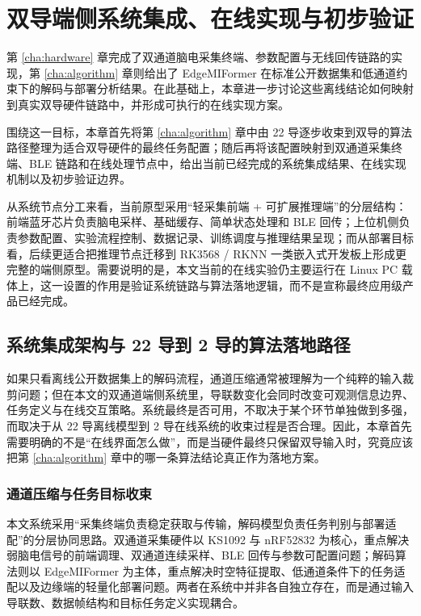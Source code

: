 \chapter{双导端侧系统集成、在线实现与初步验证}
\label{cha:verification}

第 \ref{cha:hardware} 章完成了双通道脑电采集终端、参数配置与无线回传链路的实现，第 \ref{cha:algorithm} 章则给出了 EdgeMIFormer 在标准公开数据集和低通道约束下的解码与部署分析结果。在此基础上，本章进一步讨论这些离线结论如何映射到真实双导硬件链路中，并形成可执行的在线实现方案。

围绕这一目标，本章首先将第 \ref{cha:algorithm} 章中由 22 导逐步收束到双导的算法路径整理为适合双导硬件的最终任务配置；随后再将该配置映射到双通道采集终端、BLE 链路和在线处理节点中，给出当前已经完成的系统集成结果、在线实现机制以及初步验证边界。

从系统节点分工来看，当前原型采用“轻采集前端 + 可扩展推理端”的分层结构：前端蓝牙芯片负责脑电采样、基础缓存、简单状态处理和 BLE 回传；上位机侧负责参数配置、实验流程控制、数据记录、训练调度与推理结果呈现；而从部署目标看，后续更适合把推理节点迁移到 RK3568 / RKNN 一类嵌入式开发板上形成更完整的端侧原型。需要说明的是，本文当前的在线实验仍主要运行在 Linux PC 载体上，这一设置的作用是验证系统链路与算法落地逻辑，而不是宣称最终应用级产品已经完成。

\section{系统集成架构与 22 导到 2 导的算法落地路径}

如果只看离线公开数据集上的解码流程，通道压缩通常被理解为一个纯粹的输入裁剪问题；但在本文的双通道端侧系统里，导联数变化会同时改变可观测信息边界、任务定义与在线交互策略。系统最终是否可用，不取决于某个环节单独做到多强，而取决于从 22 导离线模型到 2 导在线系统的收束过程是否合理。因此，本章首先需要明确的不是“在线界面怎么做”，而是当硬件最终只保留双导输入时，究竟应该把第 \ref{cha:algorithm} 章中的哪一条算法结论真正作为落地方案。

\subsection{通道压缩与任务目标收束}

本文系统采用“采集终端负责稳定获取与传输，解码模型负责任务判别与部署适配”的分层协同思路。双通道采集硬件以 KS1092 与 nRF52832 为核心，重点解决弱脑电信号的前端调理、双通道连续采样、BLE 回传与参数可配置问题；解码算法则以 EdgeMIFormer 为主体，重点解决时空特征提取、低通道条件下的任务适配以及边缘端的轻量化部署问题。两者在系统中并非各自独立存在，而是通过输入导联数、数据帧结构和目标任务定义实现耦合。

